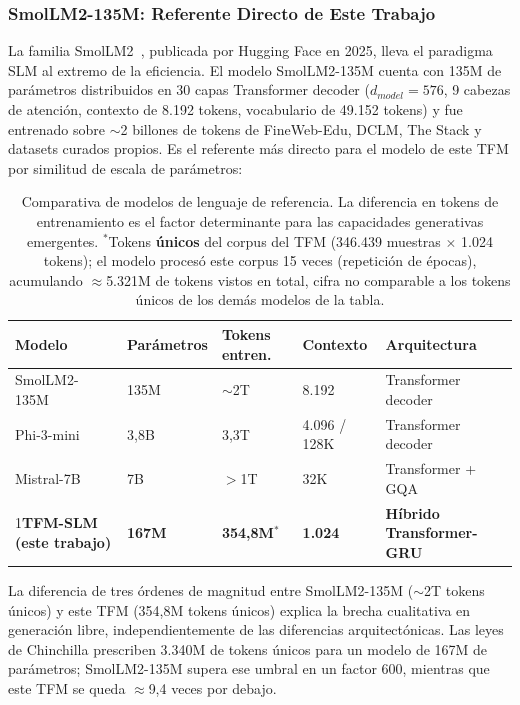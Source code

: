 \subsubsection{SmolLM2-135M: Referente Directo de Este Trabajo}

La familia SmolLM2~\cite{allal2025smollm2}, publicada por Hugging Face en 2025, lleva el paradigma SLM al extremo de la eficiencia. El modelo SmolLM2-135M cuenta con 135M de parámetros distribuidos en 30 capas Transformer decoder ($d_{model}=576$, 9 cabezas de atención, contexto de 8.192 tokens, vocabulario de 49.152 tokens) y fue entrenado sobre $\sim$2 billones de tokens de FineWeb-Edu, DCLM, The Stack y datasets curados propios. Es el referente más directo para el modelo de este TFM por similitud de escala de parámetros:

\begin{table}[H]
\centering
\small
\begin{tabular}{|p{3.2cm}|p{1.7cm}|p{2.2cm}|p{1.8cm}|p{4.2cm}|}
\hline
\textbf{Modelo} & \textbf{Parámetros} & \textbf{Tokens entren.} & \textbf{Contexto} & \textbf{Arquitectura} \\ \hline
SmolLM2-135M~\cite{allal2025smollm2} & 135M & $\sim$2T & 8.192 & Transformer decoder \\ \hline
Phi-3-mini~\cite{abdin2024phi3} & 3,8B & 3,3T & 4.096 / 128K & Transformer decoder \\ \hline
Mistral-7B~\cite{jiang2023mistral} & 7B & $>$1T & 32K & Transformer + GQA \\ \hline
1\textbf{TFM-SLM (este trabajo)} & \textbf{167M} & \textbf{354,8M}$^*$ & \textbf{1.024} & \textbf{Híbrido Transformer-GRU} \\ \hline
\end{tabular}
\caption{Comparativa de modelos de lenguaje de referencia. La diferencia en tokens de entrenamiento es el factor determinante para las capacidades generativas emergentes. $^*$Tokens \textbf{únicos} del corpus del TFM (346.439 muestras $\times$ 1.024 tokens); el modelo procesó este corpus 15 veces (repetición de épocas), acumulando $\approx$5.321M de tokens vistos en total, cifra no comparable a los tokens únicos de los demás modelos de la tabla.}
\label{tab:slm_comparison}
\end{table}

La diferencia de tres órdenes de magnitud entre SmolLM2-135M ($\sim$2T tokens únicos) y este TFM (354,8M tokens únicos) explica la brecha cualitativa en generación libre, independientemente de las diferencias arquitectónicas. Las leyes de Chinchilla prescriben 3.340M de tokens únicos para un modelo de 167M de parámetros; SmolLM2-135M supera ese umbral en un factor 600, mientras que este TFM se queda $\approx$9,4 veces por debajo.

